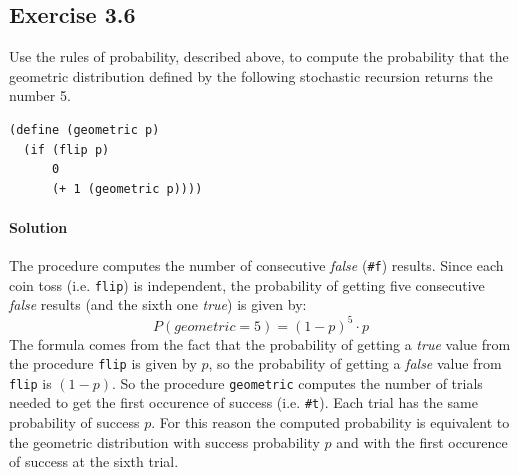 \subsection*{Exercise 3.6}
Use the rules of probability, described above, to compute the probability that the geometric distribution 
defined by the following stochastic recursion returns the number 5.

\begin{lstlisting}
(define (geometric p)
  (if (flip p)
      0
      (+ 1 (geometric p))))
\end{lstlisting}

\paragraph{Solution}
The procedure computes the number of consecutive \textit{false} (\texttt{\#f}) results. Since each coin toss (i.e. \texttt{flip}) is 
independent, the probability of getting five consecutive \textit{false} results (and the sixth one \textit{true}) is given by:
\[ P(geometric = 5) = (1 - p)^{5} \cdot p \]
The formula comes from the fact that the probability of getting a \textit{true} value from the procedure \texttt{flip} is given by
$p$, so the probability of getting a \textit{false} value from \texttt{flip} is $ (1 - p) $.
So the procedure \texttt{geometric} computes the number of trials needed to get the first occurence of success (i.e. \texttt{\#t}).
Each trial has the same probability of success $p$.
For this reason the computed probability is equivalent to the geometric distribution with success probability $p$ and with the 
first occurence of success at the sixth trial.

